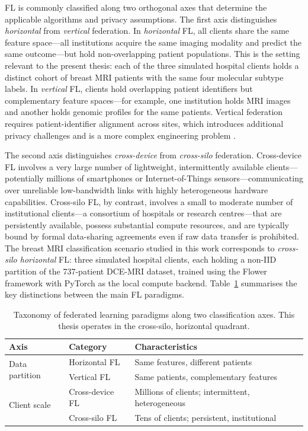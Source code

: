 FL is commonly classified along two orthogonal axes that determine the
applicable algorithms and privacy assumptions.
The first axis distinguishes \emph{horizontal} from \emph{vertical}
federation.
In \emph{horizontal} FL, all clients share the same feature space—all
institutions acquire the same imaging modality and predict the same
outcome—but hold non-overlapping patient populations.
This is the setting relevant to the present thesis: each of the three
simulated hospital clients holds a distinct cohort of breast MRI
patients with the same four molecular subtype labels.
In \emph{vertical} FL, clients hold overlapping patient identifiers
but complementary feature spaces—for example, one institution holds
MRI images and another holds genomic profiles for the same patients.
Vertical federation requires patient-identifier alignment across sites,
which introduces additional privacy challenges and is a more complex
engineering problem \cite{yang2019federated,kairouz2021advances}.

The second axis distinguishes \emph{cross-device} from
\emph{cross-silo} federation.
Cross-device FL involves a very large number of lightweight,
intermittently available clients—potentially millions of smartphones
or Internet-of-Things sensors—communicating over unreliable low-bandwidth
links with highly heterogeneous hardware capabilities.
Cross-silo FL, by contrast, involves a small to moderate number of
institutional clients—a consortium of hospitals or research
centres—that are persistently available, possess substantial compute
resources, and are typically bound by formal data-sharing agreements
even if raw data transfer is prohibited.
The breast MRI classification scenario studied in this work corresponds
to \emph{cross-silo horizontal} FL: three simulated hospital clients,
each holding a non-IID partition of the 737-patient DCE-MRI dataset,
trained using the Flower framework with PyTorch as the local compute
backend.
Table~\ref{tab:fl-taxonomy} summarises the key distinctions between
the main FL paradigms.

\begin{table}[htbp]
  \centering
  \caption{Taxonomy of federated learning paradigms along two
    classification axes. This thesis operates in the cross-silo,
    horizontal quadrant.}
  \label{tab:fl-taxonomy}
  \renewcommand{\arraystretch}{1.3}
  \begin{tabular}{lll}
    \hline
    \textbf{Axis} & \textbf{Category} & \textbf{Characteristics} \\
    \hline
    \multirow{2}{*}{Data partition}
      & Horizontal FL & Same features, different patients \\
      & Vertical FL   & Same patients, complementary features \\
    \hline
    \multirow{2}{*}{Client scale}
      & Cross-device FL
        & Millions of clients; intermittent, heterogeneous \\
      & Cross-silo FL
        & Tens of clients; persistent, institutional \\
    \hline
  \end{tabular}
\end{table}

